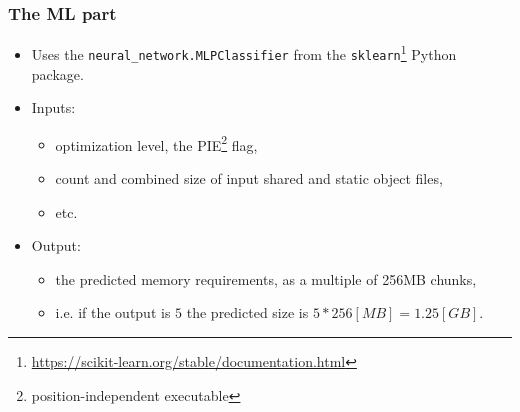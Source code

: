 \documentclass[compress,table,xcolor=table]{beamer}
\newcommand{\shelltext}[1]{\texttt{\colorbox{light-gray}{#1}}}
\begin{document}
\begin{frame}
  \frametitle{The ML part}
  \begin{itemize}
  \Large
  \item Uses the \shelltext{neural\_network.MLPClassifier} from the
    \shelltext{sklearn}\footnote{\url{https://scikit-learn.org/stable/documentation.html}}
    Python package.
  \item Inputs:
    \begin{itemize}
      \large
      \item optimization level, the PIE\footnote{position-independent executable} flag,
      \item count and combined size of input shared and static object files,
      \item etc.
    \end{itemize}
  \item Output:
    \begin{itemize}
      \large
      \item the predicted memory requirements, as a multiple of 256MB chunks,
      \item i.e. if the output is $5$ the predicted size is $5*256[MB] = 1.25[GB]$.
    \end{itemize}
  \end{itemize}
\end{frame}
\end{document}

